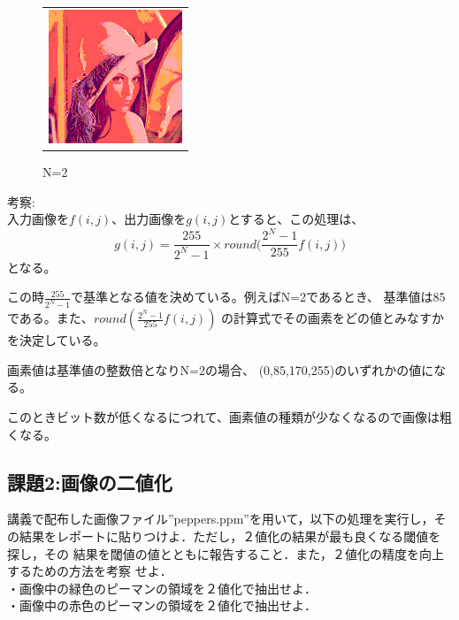 \documentclass[a4paper,titlepage,11pt]{ltjsarticle}
\begin{document}
\begin{figure}[H]
\begin{center}
\begin{tabular}{c}
\begin{minipage}{0.25\hsize}
\begin{center}
\includegraphics[width=4cm]{quantize_2bit.jpg}
\end{center}
\caption*{N=2}
\end{minipage}
\end{tabular}
\end{center}
\end{figure}

考察:\\
入力画像を$f(i,j)$、出力画像を$g(i,j)$とすると、この処理は、
\begin{equation}
	g(i,j)=\frac{255}{2^{N}-1}\times round\Big(\frac{2^{N}-1}{255}f(i,j)\Big)
\end{equation}
となる。

この時$\frac{255}{2^{N}-1}$で基準となる値を決めている。例えばN=2であるとき、
基準値は85である。また、$round(\frac{2^{N}-1}{255}f(i,j))$
の計算式でその画素をどの値とみなすかを決定している。

画素値は基準値の整数倍となりN=2の場合、
(0,85,170,255)のいずれかの値になる。

このときビット数が低くなるにつれて、画素値の種類が少なくなるので画像は粗くなる。

\subsection*{課題2:画像の二値化}
講義で配布した画像ファイル”peppers.ppm”を用いて，以下の処理を実行し，そ
の結果をレポートに貼りつけよ．ただし，２値化の結果が最も良くなる閾値を探し，その
結果を閾値の値とともに報告すること．また，２値化の精度を向上するための方法を考察
せよ．
\\・画像中の緑色のピーマンの領域を２値化で抽出せよ．
\\・画像中の赤色のピーマンの領域を２値化で抽出せよ．
\\
\end{document}
